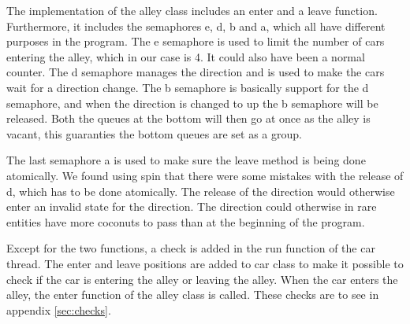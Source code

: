 The implementation of the alley class includes an enter and a leave function. Furthermore, it includes the semaphores e, d, b and a, which all have different purposes in the program. The e semaphore is used to limit the number of cars entering the alley, which in our case is 4. It could also have been a normal counter. The d semaphore manages the direction and is used to make the cars wait for a direction change. The b semaphore is basically support for the d semaphore, and when the direction is changed to up the b semaphore will be released. Both the queues at the bottom will then go at once as the alley is vacant, this guaranties the bottom queues are set as a group. 

The last semaphore a is used to make sure the leave method is being done atomically. We found using spin that there were some mistakes with the release of d, which has to be done atomically. The release of the direction would otherwise enter an invalid state for the direction. The direction could otherwise in rare entities have more coconuts to pass than at the beginning of the program.

Except for the two functions, a check is added in the run function of the car thread. The enter and leave positions are added to car class to make it possible to check if the car is entering the alley or leaving the alley. When the car enters the alley, the enter function of the alley class is called. These checks are to see in appendix \ref{sec:checks}.